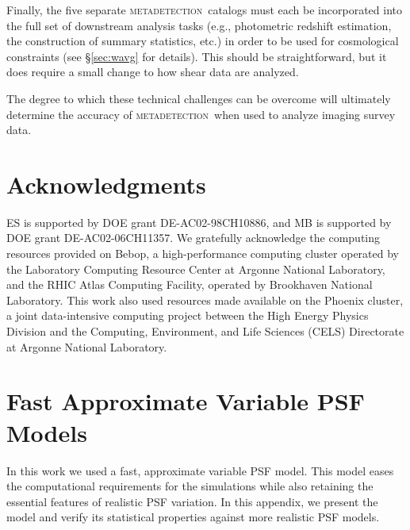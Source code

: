 \documentclass[draft, iop, twocolappendix, appendixfloats, numberedappendix, apj]{hackemulateapj}
\newcommand{\mdet}{\textsc{metadetection}}
\begin{document}
Finally, the five separate \mdet\ catalogs must each be incorporated into the
full set of downstream analysis tasks (e.g., photometric redshift estimation,
the construction of summary statistics, etc.) in order to be used for
cosmological constraints (see \S \ref{sec:wavg} for details). This should be
straightforward, but it does require a small change to how shear data are
analyzed.


The degree to which these technical challenges can be overcome will ultimately
determine the accuracy of \mdet\ when used to analyze imaging survey data.


\section*{Acknowledgments}

ES is supported by DOE grant DE-AC02-98CH10886, and MB is supported by DOE
grant DE-AC02-06CH11357.  We gratefully acknowledge the computing resources
provided on Bebop, a high-performance computing cluster operated by the
Laboratory Computing Resource Center at Argonne National Laboratory, and the
RHIC Atlas Computing Facility, operated by Brookhaven National Laboratory.
This work also used resources made available on the Phoenix cluster, a joint
data-intensive computing project between the High Energy Physics Division and
the Computing, Environment, and Life Sciences (CELS) Directorate at Argonne
National Laboratory.


%
%
%
%



\appendix

\section{Fast Approximate Variable PSF Models}\label{app:pspsf}

In this work we used a fast, approximate variable PSF model. This model eases the
computational requirements for the simulations while also retaining the
essential features of realistic PSF variation. In this appendix, we present
the model and verify its statistical properties against more realistic PSF models.
\end{document}
